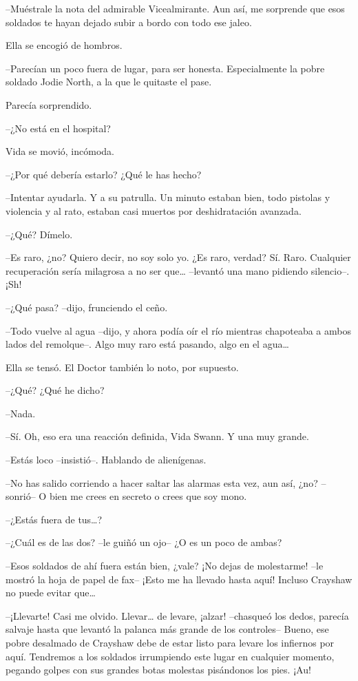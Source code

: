 {--Muéstrale la nota del admirable Vicealmirante. Aun así, me sorprende
que esos soldados te hayan dejado subir a bordo con todo ese jaleo.}

{Ella se encogió de hombros.}

{--Parecían un poco fuera de lugar, para ser honesta. Especialmente la
pobre soldado Jodie North, a la que le quitaste el pase.}

{Parecía sorprendido.}

{--¿No está en el hospital?}

{Vida se movió, incómoda.}

{--¿Por qué debería estarlo? ¿Qué le has hecho?}

{--Intentar ayudarla. Y a su patrulla. Un minuto estaban bien, todo
 pistolas y violencia y al rato, estaban casi muertos por deshidratación
avanzada.}

{--¿Qué? Dímelo.}

{--Es raro, ¿no? Quiero decir, no soy solo yo. ¿Es raro, verdad? Sí.
 Raro. Cualquier recuperación sería milagrosa a no ser que\ldots{}
--levantó una mano pidiendo silencio--. ¡Sh!}

{--¿Qué pasa? --dijo, frunciendo el ceño.}

{--Todo vuelve al agua --dijo, y ahora podía oír el río mientras
 chapoteaba a ambos lados del remolque--. Algo muy raro está pasando,
 algo en el agua\ldots{}}

{Ella se tensó. El Doctor también lo noto, por supuesto.}

{--¿Qué? ¿Qué he dicho?}

{--Nada.}

{--Sí. Oh, eso era una reacción definida, Vida Swann. Y una muy grande.}

{--Estás loco --insistió--. Hablando de alienígenas.}

{--No has salido corriendo a hacer saltar las alarmas esta vez, aun así,
¿no? --sonrió-- O bien me crees en secreto o crees que soy mono.}

{--¿Estás fuera de tus\ldots{}?}

{--¿Cuál es de las dos? --le guiñó un ojo-- ¿O es un poco de ambas?}

{--Esos soldados de ahí fuera están bien, ¿vale? ¡No dejas de
 molestarme! --le mostró la hoja de papel de fax-- ¡Esto me ha llevado
 hasta aquí! Incluso Crayshaw no puede evitar que\ldots{}}

{--¡Llevarte! Casi me olvido. Llevar\ldots{} de levare, ¡alzar!
 --chasqueó los dedos, parecía salvaje hasta que levantó la palanca más
 grande de los controles-- Bueno, ese pobre desalmado de Crayshaw debe de
 estar listo para levare los infiernos por aquí. Tendremos a los soldados
 irrumpiendo este lugar en cualquier momento, pegando golpes con sus
grandes botas molestas pisándonos los pies. ¡Au!}

